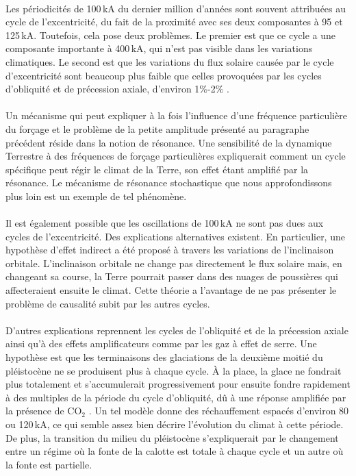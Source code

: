 \paragraph{} Les périodicités de 100\,kA du dernier million d'années sont souvent attribuées au cycle de l'excentricité, du fait de la proximité avec ses deux composantes à 95 et 125\,kA. Toutefois, cela pose deux problèmes. Le premier est que ce cycle a une composante importante à 400\,kA, qui n'est pas visible dans les variations climatiques. Le second est que les variations du flux solaire causée par le cycle d'excentricité sont beaucoup plus faible que celles provoquées par les cycles d'obliquité et de précession axiale, d'environ 1\%-2\% \cite{ruddiman2006}.

\paragraph{} Un mécanisme qui peut expliquer à la fois l'influence d'une fréquence particulière du forçage et le problème de la petite amplitude présenté au paragraphe précédent réside dans la notion de résonance. Une sensibilité de la dynamique Terrestre à des fréquences de forçage particulières expliquerait comment un cycle spécifique peut régir le climat de la Terre, son effet étant amplifié par la résonance. Le mécanisme de résonance stochastique que nous approfondissons plus loin est un exemple de tel phénomène. 

\paragraph{} Il est également possible que les oscillations de 100\,kA ne sont pas dues aux cycles de l'excentricité. Des explications alternatives existent. En particulier, une hypothèse d'effet indirect a été proposé \cite{muller1995} à travers les variations de l'inclinaison orbitale. L'inclinaison orbitale ne change pas directement le flux solaire mais, en changeant sa course, la Terre pourrait passer dans des nuages de poussières qui affecteraient ensuite le climat. Cette théorie a l'avantage de ne pas présenter le problème de causalité subit par les autres cycles.

\paragraph{} D'autres explications reprennent les cycles de l'obliquité et de la précession axiale ainsi qu'à des effets amplificateurs comme par les gaz à effet de serre. Une hypothèse est que les terminaisons des glaciations de la deuxième moitié du pléistocène ne se produisent plus à chaque cycle. À la place, la glace ne fondrait plus totalement et s'accumulerait progressivement pour ensuite fondre rapidement à des multiples de la période du cycle d'obliquité, dû à une réponse amplifiée par la présence de CO$_2$ \cite{ruddiman2006}. Un tel modèle donne des réchauffement espacés d'environ 80 ou 120\,kA, ce qui semble assez bien décrire l'évolution du climat à cette période. De plus, la transition du milieu du pléistocène s'expliquerait par le changement entre un régime où la fonte de la calotte est totale à chaque cycle et un autre où la fonte est partielle.

